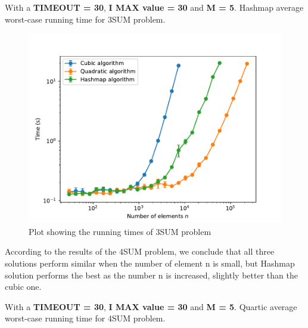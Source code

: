 \documentclass[12pt, a4paper]{article}
\begin{document}
\begin{table}[h]
  \begin{center}
  \caption{With a \textbf{TIMEOUT = 30}, \textbf{I MAX value = 30} and \textbf{M = 5}. 
  Hashmap average worst-case running time for 3SUM problem.}
  \label{tbl:threesum_hashmap}
  
  \end{center}
\end{table}

\begin{figure}[h]
  \begin{center}
    \includegraphics[width=\textwidth]{Plot_threesum.pdf}
    \caption{Plot showing the running times of 3SUM problem}
    \label{fig:plot3sum}
  \end{center}
\end{figure}

\clearpage

According to the results of the 4SUM problem, we conclude that all three solutions perform similar when the number of element n is small, but Hashmap solution performs the best as the number n is increased, slightly better than the cubic one.

\begin{table}[h]
  \begin{center}
  \caption{With a \textbf{TIMEOUT = 30}, \textbf{I MAX value = 30} and \textbf{M = 5}. 
  Quartic average worst-case running time for 4SUM problem.}
  \label{tbl:threesum_quadratic}
  
  \end{center}
\end{table}
\end{document}
